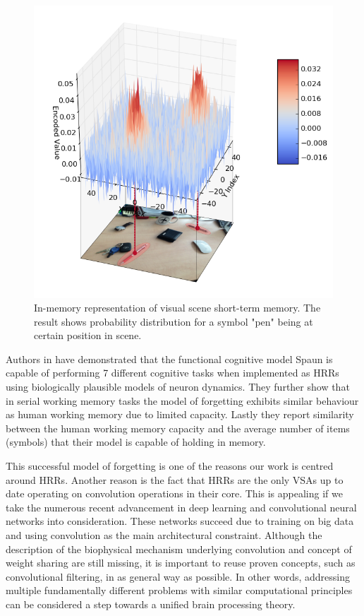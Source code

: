 \documentclass[journal]{journal}
\begin{document}
	
	\begin{figure}
		\center
		\includegraphics[width=0.9\columnwidth]{img/probe_for_pen_w_img.png}
		\caption{In-memory representation of visual scene short-term memory. The result shows probability distribution for a symbol "pen" being at certain position in scene.}
	\end{figure}
	
	
	Authors in \cite{Eliasmith:2012:LargeScaleModel} have demonstrated that the functional cognitive model Spaun is capable of performing 7 different cognitive tasks when implemented as HRRs using biologically plausible models of neuron dynamics.
They further show that in serial working memory tasks the model of forgetting exhibits similar behaviour as human working memory due to limited capacity.
Lastly they report similarity between the human working memory capacity and the average number of items (symbols) that their model is capable of holding in memory.

	This successful model of forgetting is one of the reasons our work is centred around HRRs. Another reason is the fact that HRRs are the only VSAs up to date operating on convolution operations in their core.
This is appealing if we take the numerous recent advancement in deep learning and convolutional neural networks into consideration.
These networks succeed due to training on big data and using convolution as the main architectural constraint.
Although the description of the biophysical mechanism underlying convolution and concept of weight sharing are still missing, it is important to reuse proven concepts, such as convolutional filtering, in as general way as possible.
In other words, addressing multiple fundamentally different problems with similar computational principles can be considered a step towards a unified brain processing theory.
	
\end{document}

